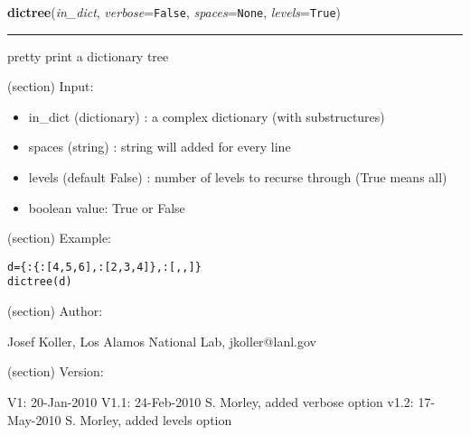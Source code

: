     \label{spacepy:toolbox:dictree}

    \vspace{0.5ex}

\hspace{.8\funcindent}\begin{boxedminipage}{\funcwidth}

    \raggedright \textbf{dictree}(\textit{in\_dict}, \textit{verbose}={\tt False}, \textit{spaces}={\tt None}, \textit{levels}={\tt True})

    \vspace{-1.5ex}

    \rule{\textwidth}{0.5\fboxrule}
\setlength{\parskip}{2ex}
    pretty print a dictionary tree

    (section) Input:

      \begin{itemize}
      \setlength{\parskip}{0.6ex}
        \item in\_dict (dictionary) : a complex dictionary (with substructures)

        \item spaces (string) : string will added for every line

        \item levels (default False) : number of levels to recurse through 
          (True means all)

        \item boolean value: True or False

      \end{itemize}

    (section) Example:

\begin{alltt}
\pysrcprompt{{\textgreater}{\textgreater}{\textgreater} }d = \{:\{:[4,5,6], :[2,3,4]\}, :[, , ]\}
\pysrcprompt{{\textgreater}{\textgreater}{\textgreater} }dictree(d)
\pysrcoutput{+}
\end{alltt}
    (section) Author:

      Josef Koller, Los Alamos National Lab, jkoller@lanl.gov

    (section) Version:

      V1: 20-Jan-2010 V1.1: 24-Feb-2010 S. Morley, added verbose option 
      v1.2: 17-May-2010 S. Morley, added levels option

\setlength{\parskip}{1ex}
    \end{boxedminipage}

